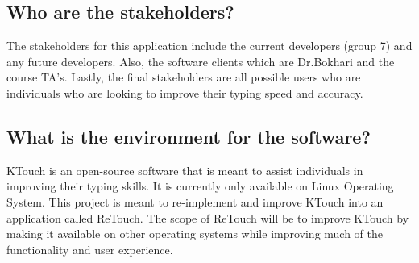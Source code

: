 \documentclass[11pt, oneside]{article}
\begin{document}
\subsection{Who are the stakeholders?}

The stakeholders for this application include the current developers (group 7) and any future developers. Also, the software clients which are Dr.Bokhari and the course TA's. Lastly, the final stakeholders are all possible users who are individuals who are looking to improve their typing speed and accuracy. 

 
\subsection{What is the environment for the software?}

KTouch is an open-source software that is meant to assist individuals in improving their typing skills. It is currently only available on Linux Operating System. This project is meant to re-implement and improve KTouch into an application called ReTouch. The scope of ReTouch will be to improve KTouch by making it available on other operating systems while improving much of the functionality and user experience. 
\end{document}
